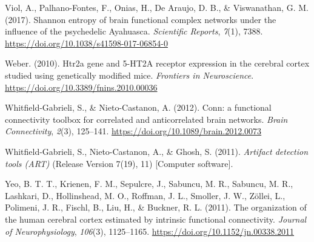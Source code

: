 \begin{CSLReferences}{1}{0}
Viol, A., Palhano-Fontes, F., Onias, H., De Araujo, D. B., \&
Viswanathan, G. M. (2017). Shannon entropy of brain functional complex
networks under the influence of the psychedelic Ayahuasca.
\emph{Scientific Reports}, \emph{7}(1), 7388.
\url{https://doi.org/10.1038/s41598-017-06854-0}

Weber. (2010). Htr2a gene and 5-HT2A receptor expression in the cerebral
cortex studied using genetically modified mice. \emph{Frontiers in
Neuroscience}. \url{https://doi.org/10.3389/fnins.2010.00036}

Whitfield-Gabrieli, S., \& Nieto-Castanon, A. (2012). Conn: a functional
connectivity toolbox for correlated and anticorrelated brain networks.
\emph{Brain Connectivity}, \emph{2}(3), 125--141.
\url{https://doi.org/10.1089/brain.2012.0073}

Whitfield-Gabrieli, S., Nieto-Castanon, A., \& Ghosh, S. (2011).
\emph{Artifact detection tools (ART)} (Release Version 7(19), 11)
{[}Computer software{]}.

Yeo, B. T. T., Krienen, F. M., Sepulcre, J., Sabuncu, M. R., Sabuncu, M.
R., Lashkari, D., Hollinshead, M. O., Roffman, J. L., Smoller, J. W.,
Zöllei, L., Polimeni, J. R., Fischl, B., Liu, H., \& Buckner, R. L.
(2011). The organization of the human cerebral cortex estimated by
intrinsic functional connectivity. \emph{Journal of Neurophysiology},
\emph{106}(3), 1125--1165. \url{https://doi.org/10.1152/jn.00338.2011}

\end{CSLReferences}


